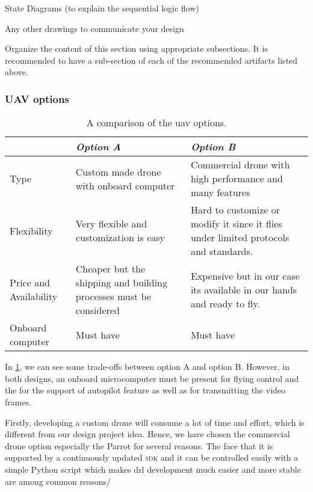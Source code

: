 \documentclass[../main.tex]{subfiles}
\begin{document}
\begin{newrequirements}
\begin{todolist}
\begin{todolist}
        \item State Diagrams (to explain the 
        sequential logic flow) 

        \item Any other drawings to communicate your 
        design 
        \end{todolist}

        \item [\done] Organize the content of this section 
        using appropriate subsections. It is 
        recommended to have a sub-section of 
        each of the recommended artifacts 
        listed above. 

    \end{todolist}
\end{newrequirements}


\subsubsection{UAV options}
\begin{table}[H]
	\centering
	\caption{A comparison of the \gls{uav} options.}
	\label{tab:alt-solutions}
	\begin{tabularx}{\textwidth}{ p{4cm} X X }
		\toprule
		\textit{} & \textit{Option A} & \textit{Option B}\\ \midrule
		Type  & Custom made drone with onboard computer & 
		Commercial drone with high performance and many features    \\
		Flexibility & Very flexible and customization is easy & 
		Hard to customize or modify it since it flies under 
		limited protocols and standards. \\
		
		Price and Availability & Cheaper but the shipping and 
		building processes must be considered & Expensive but 
		in our case its available in our hands and ready to fly.   \\
		
		Onboard computer & Must have & Must have \\
		\bottomrule
	\end{tabularx}
\end{table} 

In \cref{tab:alt-solutions}, 
we can see some trade-offs 
between option A and option B. However, in both designs, 
an onboard microcomputer must be present for 
flying control and the for the support of autopilot feature as well as for 
transmitting the video frames. 


Firstly, developing a custom drone will consume a lot of time and effort, 
which is different from our design project idea.
Hence, we have chosen the commercial drone option especially 
the Parrot \anafi for several reasons.
The face that it is supported by a continuously updated 
\textsc{sdk} and it can be controlled easily 
with a simple Python script which makes 
\gls{drl} development much easier and more stable are among common reasons/
\end{document}
